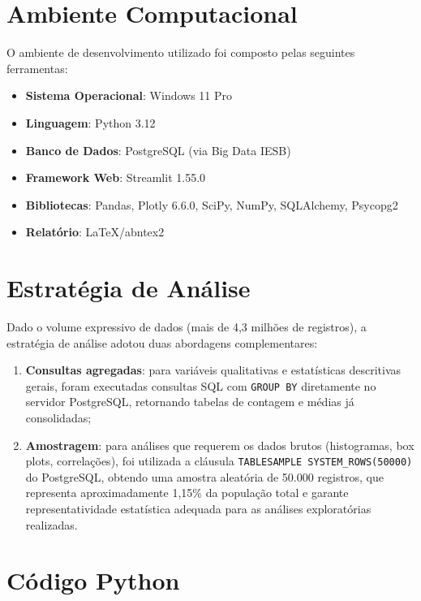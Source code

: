 \documentclass[
    12pt,
    oneside,
    a4paper,
    chapter=TITLE,
    section=TITLE
]{abntex2}
\begin{document}
\section{Ambiente Computacional}

O ambiente de desenvolvimento utilizado foi composto pelas seguintes ferramentas:

\begin{itemize}
    \item \textbf{Sistema Operacional}: Windows 11 Pro
    \item \textbf{Linguagem}: Python 3.12
    \item \textbf{Banco de Dados}: PostgreSQL (via Big Data IESB)
    \item \textbf{Framework Web}: Streamlit 1.55.0
    \item \textbf{Bibliotecas}: Pandas, Plotly 6.6.0, SciPy, NumPy, SQLAlchemy, Psycopg2
    \item \textbf{Relatório}: LaTeX/abntex2
\end{itemize}

\section{Estratégia de Análise}

Dado o volume expressivo de dados (mais de 4,3 milhões de registros), a estratégia de análise
adotou duas abordagens complementares:

\begin{enumerate}
    \item \textbf{Consultas agregadas}: para variáveis qualitativas e estatísticas descritivas
    gerais, foram executadas consultas SQL com \texttt{GROUP BY} diretamente no servidor
    PostgreSQL, retornando tabelas de contagem e médias já consolidadas;

    \item \textbf{Amostragem}: para análises que requerem os dados brutos (histogramas,
    box plots, correlações), foi utilizada a cláusula \texttt{TABLESAMPLE SYSTEM\_ROWS(50000)}
    do PostgreSQL, obtendo uma amostra aleatória de 50.000 registros, que representa
    aproximadamente 1,15\% da população total e garante representatividade estatística
    adequada para as análises exploratórias realizadas.
\end{enumerate}

\section{Código Python}
\end{document}
